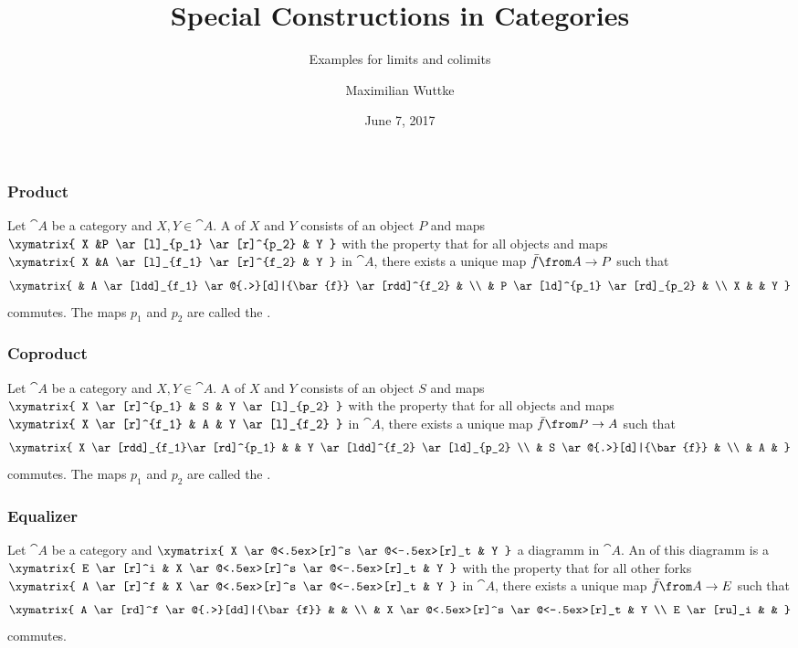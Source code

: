 \documentclass{beamer}
\title{Special Constructions in Categories}
\subtitle{Examples for limits and colimits}
\author{Maximilian Wuttke}
\date{June 7, 2017}
\begin{document}
\frame{\titlepage}

\begin{frame}
  \frametitle{Product}

  Let $\cat{A}$ be a category and $X, Y \in \cat{A}$.
  A  of $X$ and $Y$ consists of an object $P$ and maps \\
  $ \xymatrix{
    X &P \ar[l]_{p_1} \ar[r]^{p_2} & Y
  } $
  with the property that for all objects and maps \\
  $ \xymatrix{
    X &A \ar[l]_{f_1} \ar[r]^{f_2} & Y
  } $
  in $\cat{A}$, there exists a unique map $\bar{f}\from A \to P$ such that
  \[ \xymatrix{
    & A \ar[ldd]_{f_1} \ar@{.>}[d]|{\bar{f}} \ar[rdd]^{f_2} & \\
    & P \ar[ld]^{p_1} \ar[rd]_{p_2} & \\
    X & & Y
  } \]
  commutes. The maps $p_1$ and $p_2$ are called the .

\end{frame}

\begin{frame}
  \frametitle{Coproduct}

  Let $\cat{A}$ be a category and $X, Y \in \cat{A}$.
  A  of $X$ and $Y$ consists of an object $S$ and maps \\
  $ \xymatrix{
    X \ar[r]^{p_1} & S & Y \ar[l]_{p_2}
  } $
  with the property that for all objects and maps \\
  $ \xymatrix{
    X \ar[r]^{f_1} & A & Y \ar[l]_{f_2}
  } $
  in $\cat{A}$, there exists a unique map $\bar{f}\from P \to A$ such that
  \[ \xymatrix{
    X \ar[rdd]_{f_1}\ar[rd]^{p_1} & & Y \ar[ldd]^{f_2} \ar[ld]_{p_2} \\
    & S \ar@{.>}[d]|{\bar{f}} & \\
    & A &
  } \]
  commutes. The maps $p_1$ and $p_2$ are called the .
\end{frame}

\begin{frame}
  \frametitle{Equalizer}

  Let $\cat{A}$ be a category and
  $ \xymatrix{
    X \ar@<.5ex>[r]^s \ar@<-.5ex>[r]_t & Y
  } $
  a diagramm in $\cat{A}$.
  An  of this diagramm is a  \\
  $ \xymatrix{
    E \ar[r]^i & X \ar@<.5ex>[r]^s \ar@<-.5ex>[r]_t & Y
  } $
  with the property that for all other forks
  $ \xymatrix{
    A \ar[r]^f & X \ar@<.5ex>[r]^s \ar@<-.5ex>[r]_t & Y
  } $
  in $\cat{A}$, there exists a unique map $\bar{f}\from A \to E$ such that
  \[ \xymatrix{
    A \ar[rd]^f \ar@{.>}[dd]|{\bar{f}} & & \\
    & X \ar@<.5ex>[r]^s \ar@<-.5ex>[r]_t & Y \\
    E \ar[ru]_i & &
  } \]
  commutes.
\end{frame}
\end{document}
